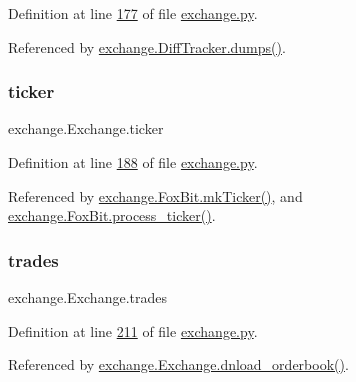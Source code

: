 Definition at line \hyperlink{exchange_8py_source_l00177}{177} of file \hyperlink{exchange_8py_source}{exchange.\+py}.



Referenced by \hyperlink{exchange_8py_source_l00385}{exchange.\+Diff\+Tracker.\+dumps()}.

\mbox{\label{classexchange_1_1_exchange_a7cf9e52f993627955a2e242c388daaeb}} 
\subsubsection{\texorpdfstring{ticker}{ticker}}
{\footnotesize\ttfamily exchange.\+Exchange.\+ticker}



Definition at line \hyperlink{exchange_8py_source_l00188}{188} of file \hyperlink{exchange_8py_source}{exchange.\+py}.



Referenced by \hyperlink{exchange_8py_source_l00584}{exchange.\+Fox\+Bit.\+mk\+Ticker()}, and \hyperlink{exchange_8py_source_l00563}{exchange.\+Fox\+Bit.\+process\+\_\+ticker()}.

\mbox{\label{classexchange_1_1_exchange_a30e87a377320ce05bd956fb014683641}} 
\subsubsection{\texorpdfstring{trades}{trades}}
{\footnotesize\ttfamily exchange.\+Exchange.\+trades}



Definition at line \hyperlink{exchange_8py_source_l00211}{211} of file \hyperlink{exchange_8py_source}{exchange.\+py}.



Referenced by \hyperlink{exchange_8py_source_l00222}{exchange.\+Exchange.\+dnload\+\_\+orderbook()}.

\mbox{\label{classexchange_1_1_exchange_a83174d2fe96a1c737231d3b8b18d9807}} 
